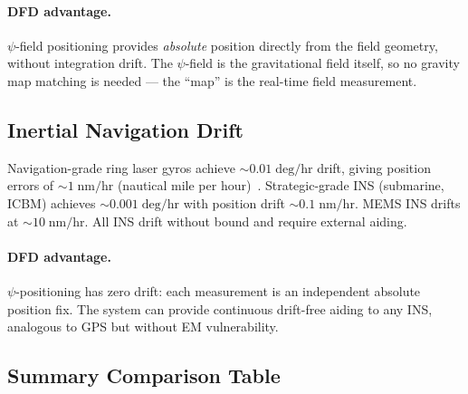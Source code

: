 \documentclass[twocolumn,superscriptaddress,prd,nofootinbib]{revtex4-2}
\begin{document}
\paragraph{DFD advantage.}
$\psi$-field positioning provides \emph{absolute} position directly
from the field geometry, without integration drift. The $\psi$-field is
the gravitational field itself, so no gravity map matching is needed ---
the ``map'' is the real-time field measurement.

\subsection{Inertial Navigation Drift}

Navigation-grade ring laser gyros achieve $\sim 0.01\;\text{deg/hr}$
drift, giving position errors of $\sim 1\;\text{nm/hr}$ (nautical
mile per hour)~\cite{Chatfield1997,Titterton2004INS}. Strategic-grade
INS (submarine, ICBM) achieves $\sim 0.001\;\text{deg/hr}$ with
position drift $\sim 0.1\;\text{nm/hr}$. MEMS INS drifts at
$\sim 10\;\text{nm/hr}$. All INS drift without bound and require
external aiding.

\paragraph{DFD advantage.}
$\psi$-positioning has zero drift: each measurement is an independent
absolute position fix. The system can provide continuous drift-free
aiding to any INS, analogous to GPS but without EM vulnerability.

\subsection{Summary Comparison Table}
\end{document}
